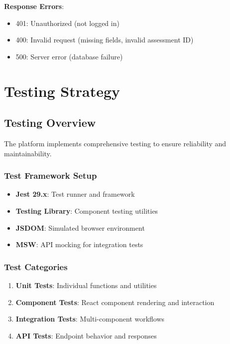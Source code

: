 \documentclass[12pt,a4paper]{report}
\begin{document}
\textbf{Response Errors}:
\begin{itemize}
    \item 401: Unauthorized (not logged in)
    \item 400: Invalid request (missing fields, invalid assessment ID)
    \item 500: Server error (database failure)
\end{itemize}

\chapter{Testing Strategy}

\section{Testing Overview}

The platform implements comprehensive testing to ensure reliability and maintainability.

\subsection{Test Framework Setup}

\begin{itemize}
    \item \textbf{Jest 29.x}: Test runner and framework
    \item \textbf{Testing Library}: Component testing utilities
    \item \textbf{JSDOM}: Simulated browser environment
    \item \textbf{MSW}: API mocking for integration tests
\end{itemize}

\subsection{Test Categories}

\begin{enumerate}
    \item \textbf{Unit Tests}: Individual functions and utilities
    \item \textbf{Component Tests}: React component rendering and interaction
    \item \textbf{Integration Tests}: Multi-component workflows
    \item \textbf{API Tests}: Endpoint behavior and responses
\end{enumerate}
\end{document}
